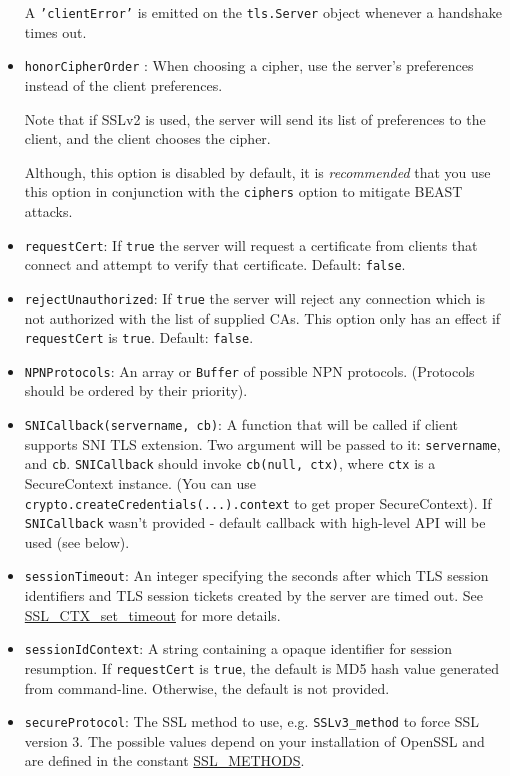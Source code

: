 \begin{itemize}
  A \texttt{'clientError'} is emitted on the \texttt{tls.Server} object
  whenever a handshake times out.
\item
  \texttt{honorCipherOrder} : When choosing a cipher, use the server's
  preferences instead of the client preferences.

  Note that if SSLv2 is used, the server will send its list of
  preferences to the client, and the client chooses the cipher.

  Although, this option is disabled by default, it is \emph{recommended}
  that you use this option in conjunction with the \texttt{ciphers}
  option to mitigate BEAST attacks.
\item
  \texttt{requestCert}: If \texttt{true} the server will request a
  certificate from clients that connect and attempt to verify that
  certificate. Default: \texttt{false}.
\item
  \texttt{rejectUnauthorized}: If \texttt{true} the server will reject
  any connection which is not authorized with the list of supplied CAs.
  This option only has an effect if \texttt{requestCert} is
  \texttt{true}. Default: \texttt{false}.
\item
  \texttt{NPNProtocols}: An array or \texttt{Buffer} of possible NPN
  protocols. (Protocols should be ordered by their priority).
\item
  \texttt{SNICallback(servername, cb)}: A function that will be called
  if client supports SNI TLS extension. Two argument will be passed to
  it: \texttt{servername}, and \texttt{cb}. \texttt{SNICallback} should
  invoke \texttt{cb(null, ctx)}, where \texttt{ctx} is a SecureContext
  instance. (You can use \texttt{crypto.createCredentials(...).context}
  to get proper SecureContext). If \texttt{SNICallback} wasn't provided
  - default callback with high-level API will be used (see below).
\item
  \texttt{sessionTimeout}: An integer specifying the seconds after which
  TLS session identifiers and TLS session tickets created by the server
  are timed out. See
  \href{http://www.openssl.org/docs/ssl/SSL\_CTX\_set\_timeout.html}{SSL\_CTX\_set\_timeout}
  for more details.
\item
  \texttt{sessionIdContext}: A string containing a opaque identifier for
  session resumption. If \texttt{requestCert} is \texttt{true}, the
  default is MD5 hash value generated from command-line. Otherwise, the
  default is not provided.
\item
  \texttt{secureProtocol}: The SSL method to use, e.g.
  \texttt{SSLv3\_method} to force SSL version 3. The possible values
  depend on your installation of OpenSSL and are defined in the constant
  \href{http://www.openssl.org/docs/ssl/ssl.html\#DEALING\_WITH\_PROTOCOL\_METHODS}{SSL\_METHODS}.
\end{itemize}

